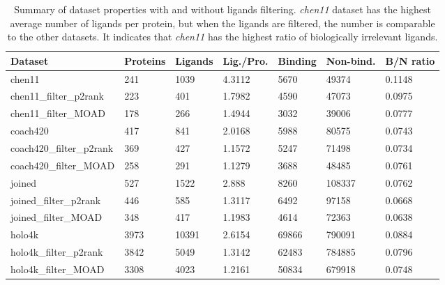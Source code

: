 \begin{table}[]
\footnotesize
\begin{tabular}{@{}lllllll@{}}
\toprule
Dataset                  & Proteins & Ligands & Lig./Pro. & Binding & Non-bind. & B/N ratio \\ \midrule
chen11                   & 241      & 1039    & 4.3112        & 5670         & 49374            & 0.1148    \\
chen11\_filter\_p2rank   & 223      & 401     & 1.7982        & 4590         & 47073            & 0.0975    \\
chen11\_filter\_MOAD     & 178      & 266     & 1.4944        & 3032         & 39006            & 0.0777    \\
coach420                 & 417      & 841     & 2.0168        & 5988         & 80575            & 0.0743    \\
coach420\_filter\_p2rank & 369      & 427     & 1.1572        & 5247         & 71498            & 0.0734    \\
coach420\_filter\_MOAD   & 258      & 291     & 1.1279        & 3688         & 48485            & 0.0761    \\
joined                   & 527      & 1522    & 2.888         & 8260         & 108337           & 0.0762    \\
joined\_filter\_p2rank   & 446      & 585     & 1.3117        & 6492         & 97158            & 0.0668    \\
joined\_filter\_MOAD     & 348      & 417     & 1.1983        & 4614         & 72363            & 0.0638    \\
holo4k                   & 3973     & 10391   & 2.6154        & 69866        & 790091           & 0.0884    \\
holo4k\_filter\_p2rank   & 3842     & 5049    & 1.3142        & 62483        & 784885           & 0.0796    \\
holo4k\_filter\_MOAD     & 3308     & 4023    & 1.2161        & 50834        & 679918           & 0.0748    \\ \bottomrule
\end{tabular}
\caption[Summary of dataset properties with and without ligands filtering]{Summary of dataset properties with and without ligands filtering. \textit{chen11} dataset has the highest average number of ligands per protein, but when the ligands are filtered, the number is comparable to the other datasets. It indicates that \textit{chen11} has the highest ratio of biologically irrelevant ligands.}
\label{tab:datasets}
\end{table}

